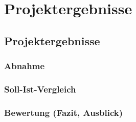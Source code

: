 \chapter{Projektergebnisse}
\label{cha:Projektergebnisse}

\section{Projektergebnisse}
	\subsection{Abnahme}
	
	\subsection{Soll-Ist-Vergleich}
	
	\subsection{Bewertung (Fazit, Ausblick)}
	